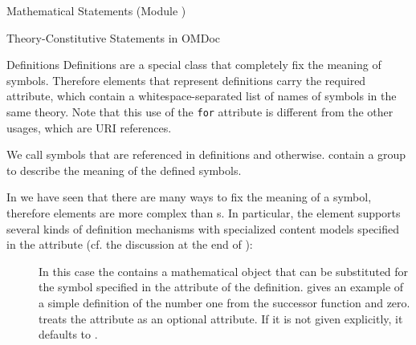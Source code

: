 \begin{tchapter}[id=statements,short=Mathematical Statements]{Mathematical Statements (Module {})}
\begin{tsection}[id=definitions]{Theory-Constitutive Statements in OMDoc}
\begin{tsubsection}[id=definitions]{Definitions}
  Definitions are a special class {} that completely fix the meaning of
  symbols.  Therefore {} elements that represent definitions carry the
  required {} attribute, which contain a whitespace-separated
  list of names of symbols in the same theory. Note that this use of the {\texttt{for}}
  attribute is different from the other usages, which are URI references.

  We call symbols that are referenced in definitions
  {} and
  {} otherwise. {} contain
  a {} {} group to describe the meaning of the defined
  symbols.

  In {} we have seen that there are many ways to fix the meaning of a
  symbol, therefore {\omdoc} {} elements are more complex than
  {s}.  In particular, the {} element supports several
  kinds of definition mechanisms with specialized content models specified in the
  {} attribute (cf. the discussion at the end of
  {}):
\begin{description}
\item[{}] In this case the {}
  contains a mathematical object that can be substituted for the symbol specified
  in the {} attribute of the definition.
  {} gives an example of a simple definition of the number one from
  the successor function and zero. {\omdoc} treats the
  {} attribute as an optional attribute. If it is not
  given explicitly, it defaults to {}.


\end{description}
\end{tsubsection}
\end{tsection}
\end{tchapter}
